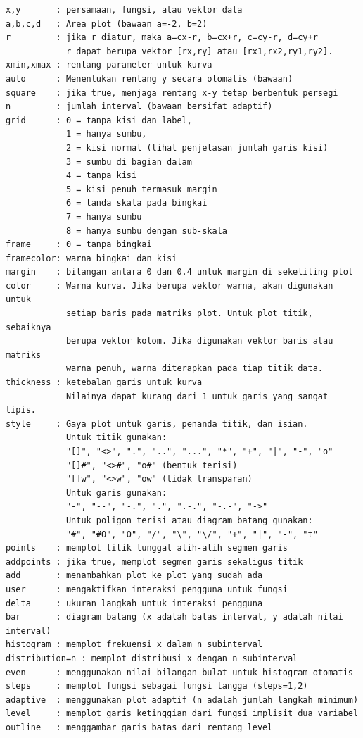 \documentclass[11pt, a4paper]{article}
\begin{document}
\begin{verbatim}
x,y       : persamaan, fungsi, atau vektor data
a,b,c,d   : Area plot (bawaan a=-2, b=2)
r         : jika r diatur, maka a=cx-r, b=cx+r, c=cy-r, d=cy+r
            r dapat berupa vektor [rx,ry] atau [rx1,rx2,ry1,ry2].
xmin,xmax : rentang parameter untuk kurva
auto      : Menentukan rentang y secara otomatis (bawaan)
square    : jika true, menjaga rentang x-y tetap berbentuk persegi
n         : jumlah interval (bawaan bersifat adaptif)
grid      : 0 = tanpa kisi dan label,
            1 = hanya sumbu,
            2 = kisi normal (lihat penjelasan jumlah garis kisi)
            3 = sumbu di bagian dalam
            4 = tanpa kisi
            5 = kisi penuh termasuk margin
            6 = tanda skala pada bingkai
            7 = hanya sumbu
            8 = hanya sumbu dengan sub-skala
frame     : 0 = tanpa bingkai
framecolor: warna bingkai dan kisi
margin    : bilangan antara 0 dan 0.4 untuk margin di sekeliling plot
color     : Warna kurva. Jika berupa vektor warna, akan digunakan untuk
            setiap baris pada matriks plot. Untuk plot titik, sebaiknya
            berupa vektor kolom. Jika digunakan vektor baris atau matriks
            warna penuh, warna diterapkan pada tiap titik data.
thickness : ketebalan garis untuk kurva
            Nilainya dapat kurang dari 1 untuk garis yang sangat tipis.
style     : Gaya plot untuk garis, penanda titik, dan isian.
            Untuk titik gunakan:
            "[]", "<>", ".", "..", "...", "*", "+", "|", "-", "o"
            "[]#", "<>#", "o#" (bentuk terisi)
            "[]w", "<>w", "ow" (tidak transparan)
            Untuk garis gunakan:
            "-", "--", "-.", ".", ".-.", "-.-", "->"
            Untuk poligon terisi atau diagram batang gunakan:
            "#", "#O", "O", "/", "\", "\/", "+", "|", "-", "t"
points    : memplot titik tunggal alih-alih segmen garis
addpoints : jika true, memplot segmen garis sekaligus titik
add       : menambahkan plot ke plot yang sudah ada
user      : mengaktifkan interaksi pengguna untuk fungsi
delta     : ukuran langkah untuk interaksi pengguna
bar       : diagram batang (x adalah batas interval, y adalah nilai interval)
histogram : memplot frekuensi x dalam n subinterval
distribution=n : memplot distribusi x dengan n subinterval
even      : menggunakan nilai bilangan bulat untuk histogram otomatis
steps     : memplot fungsi sebagai fungsi tangga (steps=1,2)
adaptive  : menggunakan plot adaptif (n adalah jumlah langkah minimum)
level     : memplot garis ketinggian dari fungsi implisit dua variabel
outline   : menggambar garis batas dari rentang level
\end{verbatim}
\end{document}
